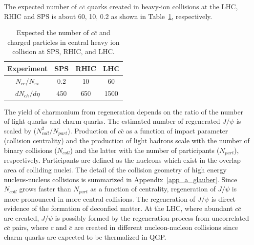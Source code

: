 The expected number of $c\bar{c}$ quarks created in heavy-ion collisions at the LHC, RHIC and SPS is about 60, 10, 0.2 as shown in Table~\ref{table_2_ncchic}, respectively.
\begin{table}
	\centering
	\begin{tabular}{cccc} \hline
	Experiment      &  SPS &  RHIC  & LHC  \\ \hline
	$N_{cc}$/$N_{ev}$ & 0.2   & 10 & 60 \\ \hline
	$dN_{ch}/d\eta$  & 450   &  650& 1500 \\ \hline	
	\end{tabular}
	\caption{Expected the number of $c\bar{c}$ and charged particles in central heavy ion collision at SPS, RHIC, and LHC. }
	\label{table_2_ncchic}
\end{table}
The yield of charmonium from regeneration depends on the ratio of the number of light quarks and charm quarks. 
The estimated number of regenerated $J/\psi$ is scaled by ($N_{coll}^{2}/N_{part}$).
Production of $c\bar{c}$ as a function of impact parameter (collision centrality) and the production of light hadrons 
scale with the number of binary collisions ($N_{coll}$) and the latter with the number of participants ($N_{part}$), respectively. 
Participants are defined as the nucleons which exist in the overlap area of colliding nuclei. 
The detail of the collision geometry of high energy nucleus-nucleus collisions is summarized in Appendix~\ref{app_a_glauber}.
Since $N_{coll}$ grows faster than $N_{part}$ as a function of centrality, regeneration of $J/\psi$ is more pronounced in more central collisions. 
The regeneration of $J/\psi$ is direct evidence of the formation of deconfied matter. 
At the LHC, where abundant $c\bar{c}$ are created, $J/\psi$ is possibly formed by the regeneration process from uncorrelated $c\bar{c}$ pairs, where $c$ and $\bar{c}$ are created in different nucleon-nucleon collisions since charm quarks are expected to be thermalized in QGP. 

